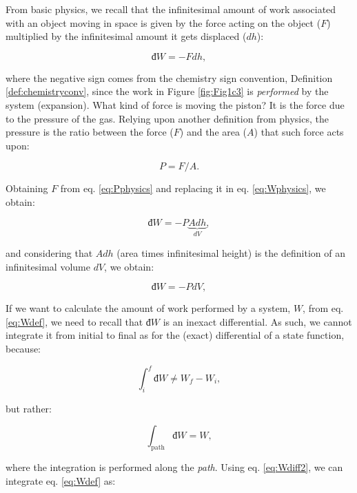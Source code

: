 \documentclass[
  9pt,
]{extbook}
\theoremstyle{definition}
\theoremstyle{definition}
\theoremstyle{definition}
\theoremstyle{remark}
\begin{document}
From basic physics, we recall that the infinitesimal amount of work associated with an object moving in space is given by the force acting on the object (\(F\)) multiplied by the infinitesimal amount it gets displaced (\(d h\)):

\begin{equation}
  đ W = - Fdh,
  \label{eq:Wphysics}
\end{equation}

where the negative sign comes from the chemistry sign convention, Definition \ref{def:chemistryconv}, since the work in Figure \ref{fig:Fig1c3} is \emph{performed} by the system (expansion). What kind of force is moving the piston? It is the force due to the pressure of the gas. Relying upon another definition from physics, the pressure is the ratio between the force (\(F\)) and the area (\(A\)) that such force acts upon:

\begin{equation}
  P = F/A.
  \label{eq:Pphysics}
\end{equation}

Obtaining \(F\) from eq. \eqref{eq:Pphysics} and replacing it in eq. \eqref{eq:Wphysics}, we obtain:

\begin{equation}
  đ W = - P \underbrace{Adh}_{dV},
  \label{eq:Wphysics2}
\end{equation}

and considering that \(Adh\) (area times infinitesimal height) is the definition of an infinitesimal volume \(dV\), we obtain:

\begin{equation}
  đ W = - PdV,
  \label{eq:Wdef}
\end{equation}

If we want to calculate the amount of work performed by a system, \(W\), from eq. \eqref{eq:Wdef}, we need to recall that \(đ W\) is an inexact differential. As such, we cannot integrate it from initial to final as for the (exact) differential of a state function, because:

\begin{equation}
  \int_{i}^{f}đ W \neq W_f - W_i,
  \label{eq:Wdiff}
\end{equation}

but rather:

\begin{equation}
  \int_{\text{path}} đ W = W,
  \label{eq:Wdiff2}
\end{equation}

where the integration is performed along the \emph{path}. Using eq. \eqref{eq:Wdiff2}, we can integrate eq. \eqref{eq:Wdef} as:
\end{document}
